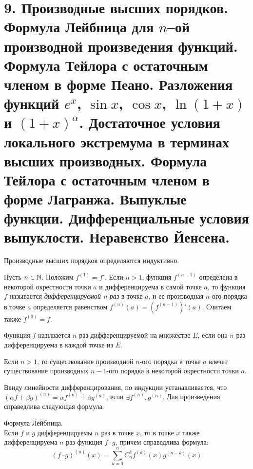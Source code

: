 \section{9. Производные высших порядков. Формула Лейбница для $n$--ой производной произведения функций. Формула Тейлора с остаточным членом в форме Пеано. Разложения функций $e^{x}$, $\sin x$, $\cos x$, $\ln(1+x)$ и $(1+x)^{\alpha}$. Достаточное условия локального экстремума в терминах высших производных. Формула Тейлора с остаточным членом в форме Лагранжа. Выпуклые функции. Дифференциальные условия выпуклости. Неравенство Йенсена.}

    Производные высших порядков определяются индуктивно.
    
    \begin{definition}
        Пусть $n \in \mathbb{N}$. Положим $f^{(1)} = f'$.
        Если $n > 1$, функция $f^{(n-1)}$ определена в некоторой окрестности точки $a$
        и дифференцируема в самой точке $a$, то функция $f$ называется
        \textit{дифференцируемой n раз} в точке $a$, и ее производная $n$-ого порядка
        в точке $a$ определяется равенством $f^{(n)}(a) = (f^{(n-1)})'(a)$.
        Считаем также $f^{(0)} = f$.    
    \end{definition}
    
    Функция $f$ называется $n$ раз дифференцируемой на множестве $E$,
    если она $n$ раз дифференцируема в каждой точке из $E$. 
    
    \begin{note}
        Если $n > 1$, то существование производной $n$-ого порядка в точке $a$
        влечет существование производных $n-1$-ого порядка в некоторой окрестности точки $a$.
    \end{note}
    
    Ввиду линейности дифференцирования, по индукции устанавливается, что $(\alpha f + \beta g)^{(n)} = \alpha f^{(n)} + \beta g^{(n)}$, если $\exists f^{(n)}, g^{(n)}$.
    Для произведения справедлива следующая формула.
    
    \begin{theorem}{Формула Лейбница.}\\
        Если $f$ и $g$ дифференцируемы $n$ раз в точке $x$,
        то в точке $x$ также дифференцируема $n$ раз функция $f \cdot g$,
        причем справедлива формула: \[(f\cdot g)^{(n)} (x) = \sum_{k = 0}^{n} C_{n}^{k}f^{(k)}(x)g^{(n-k)}(x)\]
    \end{theorem}
    
